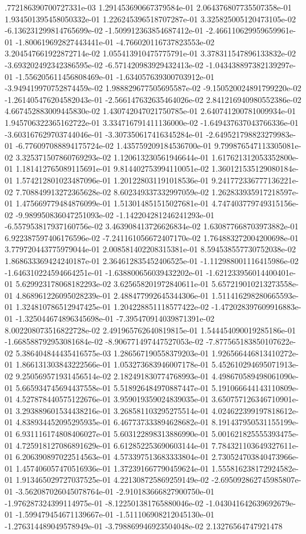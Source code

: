 .772186390700727331e-03	1.291453690667379584e-01	2.064376807735507358e-01	1.934501395458050332e-01	1.226245396518707287e-01	3.325825005120473105e-02	-6.136231299814765699e-02	-1.509912363854687412e-01	-2.466110629959659961e-01	-1.800619692827443441e-01	-4.766020116737823553e-02	3.204547661922872714e-02	1.055413910475775791e-01	3.378311547896133832e-02	-3.693202492342386595e-02	-6.571420983929432413e-02	-1.043438897382139297e-01	-1.556205611456808469e-01	-1.634057639300703912e-01	-3.949419970752874459e-02	1.988829677505695587e-02	-9.150520024891799220e-02	-1.261405476204582043e-01	-2.566147632635464026e-02	2.841216940980552386e-02	4.667452883009445830e-02	1.430742047021750785e-01	2.640741200781009934e-01	1.945706322365162722e-01	3.334716791411136000e-02	-1.649437637043766336e-01	-3.603167629703744046e-01	-3.307350617416345284e-01	-2.649521798823279983e-01	-6.776097088894175724e-02	1.435759209184536700e-01	9.799876547113305081e-02	3.325371507860769293e-02	1.120613230561946644e-01	1.617621312053352800e-01	1.181412765089115691e-01	9.814402753994110051e-02	1.360121535129080184e-01	1.574212801023487096e-01	1.201228031191018536e-01	9.241772336777136221e-02	7.708849913272365628e-02	8.602349337332997059e-02	1.262833935917218597e-01	1.475669779484876099e-01	1.513014851515027681e-01	4.747403779749315156e-02	-9.989950836047251093e-02	-1.142204281246241293e-01	-6.557953817937160756e-02	3.463908413726626834e-02	1.630877668703973882e-01	6.922387597406176596e-02	-7.241161056672407170e-02	1.764883272004200698e-01	3.779720443775979044e-01	2.008581402208315381e-01	8.594538557730752038e-02	1.868633369424240187e-01	2.364612835452406525e-01	-1.112988001116415986e-02	-1.646310224594664251e-01	-1.638800656039432202e-01	-1.621233956014400401e-01	5.629923178068182293e-02	3.625658201972840611e-01	5.657219010213273558e-01	4.868961226095028239e-01	2.488477992645344306e-01	1.511416298280665593e-01	1.324810786512947425e-01	1.204228851118577422e-02	-1.472028397609916883e-01	-1.325044674896345698e-01	-7.395470914039871391e-02	8.002208073516822728e-02	2.491965762640819815e-01	1.544454090019285186e-01	-1.668588792953081684e-02	-8.906771497447527053e-02	-7.877565183850107622e-02	5.386404844435416575e-03	1.286567190558379203e-01	1.926566446813410272e-01	1.866131303843222566e-01	1.053273683946007178e-01	5.452610294695071913e-02	9.250569571931456514e-02	2.182491830774768993e-01	4.498670589498061090e-01	5.665934745694437558e-01	5.518926484970887447e-01	5.191066644143110809e-01	4.527878440575122676e-01	3.959019359024839035e-01	3.650757126346710901e-01	3.293889601534438216e-01	3.268581103295275514e-01	4.024622399197818612e-01	4.838934452095295935e-01	6.467737333894628682e-01	8.191437950531155199e-01	6.931116174808406027e-01	5.603122898313886990e-01	5.001621825555393475e-01	4.725918127086891629e-01	6.612852253690603144e-01	7.784321103649327611e-01	6.206390897022514563e-01	4.573397513683333804e-01	2.730524703840473966e-01	1.457406057470516936e-01	1.372391667790459624e-01	1.555816238172924582e-01	1.913465029727037525e-01	4.221308725869259149e-02	-2.695092862745985807e-01	-3.562087026045078764e-01	-2.910183666827900750e-01	-1.976287324399114975e-01	-8.122501381765880046e-02	-1.043041642639692679e-01	-1.599479454671139667e-01	-1.511106908212045130e-01	-1.276314489049578949e-01	-3.798869946923504048e-02	2.13276564747921478